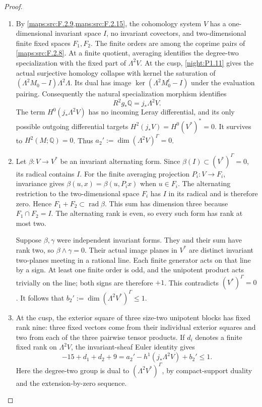\begin{proof}
\begin{enumerate}[label=\arabic*.]
\item By \cref{maps:src:F.2.9,maps:src:F.2.15}, the cohomology
system $V$ has a one-dimensional invariant space $I$, no invariant
covectors, and two-dimensional finite fixed spaces $F_1,F_2$.
The finite orders are among the coprime pairs of
\cref{maps:src:F.2.8}.  At a finite quotient, averaging identifies
the degree-two specialization with the fixed part of $\Lambda^2V$.
At the cusp, \cref{night:P1.11} gives the actual surjective homology
collapse with kernel the saturation of
$(\Lambda^2M_0-I)\Lambda^2\Lambda$.  Its dual has image
$\ker(\Lambda^2M_0^t-I)$ under the evaluation pairing.  Consequently
the natural specialization morphism identifies
\[
 R^2g_*\mathbb Q=j_*\Lambda^2V.
\]
The term $H^0(j_*\Lambda^2V)$ has no incoming Leray differential,
and its only possible outgoing differential targets
$H^2(j_*V)=H^0(V^*)^*=0$.  It survives to $H^2(M;\mathbb Q)=0$.
Thus $a_2':=\dim(\Lambda^2V)^\Gamma=0$.

\item Let $\beta:V\to V^*$ be an invariant alternating form.
Since $\beta(I)\subset(V^*)^\Gamma=0$, its radical contains $I$.
For the finite averaging projection $P_i:V\to F_i$, invariance gives
$\beta(u,x)=\beta(u,P_ix)$ when $u\in F_i$.
The alternating restriction to the two-dimensional space $F_i$
has $I$ in its radical and is therefore zero.  Hence
$F_1+F_2\subset\operatorname{rad}\beta$.  This sum has dimension
three because $F_1\cap F_2=I$.  The alternating rank is even,
so every such form has rank at most two.

Suppose $\beta,\gamma$ were independent invariant forms.
They and their sum have rank two, so
$\beta\wedge\gamma=0$.  Their actual image planes in $V^*$
are distinct invariant two-planes meeting in a rational line.
Each finite generator acts on that line by a sign.  At least one
finite order is odd, and the unipotent product acts trivially on the
line; both signs are therefore $+1$.  This contradicts
$(V^*)^\Gamma=0$.  It follows that
$b_2':=\dim(\Lambda^2V^*)^\Gamma\leq1$.

\item At the cusp, the exterior square of three size-two unipotent
blocks has fixed rank nine: three fixed vectors come from their
individual exterior squares and two from each of the three pairwise
tensor products.  If $d_i$ denotes a finite fixed rank on
$\Lambda^2V$, the invariant-sheaf Euler identity gives
\[
 -15+d_1+d_2+9
 =a_2'-h^1(j_*\Lambda^2V)+b_2'\leq1.
 \tag{F.40}\label{maps:eq:F.40}
\]
Here the degree-two group is dual to
$(\Lambda^2V^*)^\Gamma$, by compact-support duality and the
extension-by-zero sequence.


\end{enumerate}
\end{proof}
